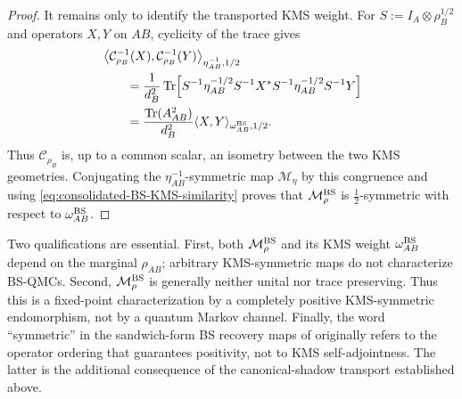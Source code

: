 \documentclass[11pt]{article}
\theoremstyle{remark}
\newcommand{\1}{\mathbbm{1}}
\begin{document}
\begin{proof}
It remains only to identify the transported KMS weight.  For
$S:=I_A\otimes\rho_B^{1/2}$ and operators $X,Y$ on $AB$, cyclicity
of the trace gives
\begin{equation}
 \begin{aligned}
 &\left\langle
 \mathcal C_{\rho_B}^{-1}(X),
 \mathcal C_{\rho_B}^{-1}(Y)
 \right\rangle_{\eta_{AB}^{-1},1/2}\\
 &\qquad
 =\frac1{d_B^2}\operatorname{Tr}\!\left[
  S^{-1}\eta_{AB}^{-1/2}S^{-1}X^*
  S^{-1}\eta_{AB}^{-1/2}S^{-1}Y
 \right]\\
 &\qquad
 =\frac{\operatorname{Tr}(A_{AB}^2)}{d_B^2}
   \langle X,Y\rangle_{\omega_{AB}^{\rm BS},1/2}.
 \end{aligned}
 \label{eq:consolidated-congruence-KMS-isometry}
\end{equation}
Thus $\mathcal C_{\rho_B}$ is, up to a common scalar, an isometry
between the two KMS geometries.  Conjugating the
$\eta_{AB}^{-1}$-symmetric map $\mathcal M_\eta$ by this congruence
and using
\eqref{eq:consolidated-BS-KMS-similarity} proves that
$\mathcal M_\rho^{\rm BS}$ is $\frac12$-symmetric with respect to
$\omega_{AB}^{\rm BS}$.
\end{proof}

Two qualifications are essential.  First, both
$\mathcal M_\rho^{\rm BS}$ and its KMS weight
$\omega_{AB}^{\rm BS}$ depend on the marginal $\rho_{AB}$; arbitrary
KMS-symmetric maps do not characterize BS-QMCs.  Second,
$\mathcal M_\rho^{\rm BS}$ is generally neither unital nor trace
preserving.  Thus this is a fixed-point characterization by a
completely positive KMS-symmetric endomorphism, not by a quantum
Markov channel.  Finally, the word ``symmetric'' in the sandwich-form
BS recovery maps of  originally
refers to the operator ordering that guarantees positivity, not to
KMS self-adjointness.  The latter is the additional consequence of
the canonical-shadow transport established above.
\end{document}
